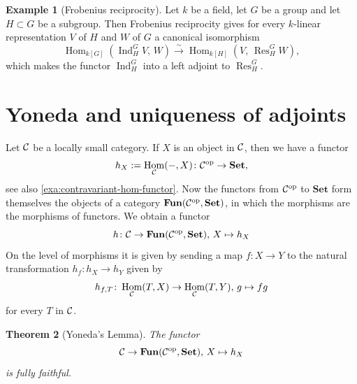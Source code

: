 \documentclass[11pt]{amsbook}
\newcommand{\isomto}{\overset{\sim}{\to}}
\DeclareMathOperator\Hom{Hom}
\DeclareMathOperator\Ind{Ind}
\DeclareMathOperator\Res{Res}
\def\opp{\mathrm{op}}
\def\Set{\mathbf{Set}}
\def\Fun{\mathbf{Fun}}
\theoremstyle{plain}
\newtheorem{theorem}{Theorem}
\theoremstyle{definition}
\newtheorem{example}[theorem]{Example}
\begin{document}
\begin{example}[Frobenius reciprocity]
Let $k$ be a field,  let $G$ be a group and let $H\subset G$ be a subgroup. Then Frobenius reciprocity gives for every $k$-linear representation $V$ of $H$ and $W$ of $G$ a canonical isomorphism
\[
	\Hom_{{k[G]}}( \Ind^G_H V,\, W ) \isomto \Hom_{{k[H]}}( V,\, \Res^G_H W ),
\]
which makes the functor $\Ind^G_H$ into a left adjoint to $\Res^G_H$.
\end{example}


\section{Yoneda and uniqueness of adjoints}
Let ${\mathcal{C}}$ be a locally small category.
If $X$ is an object in ${\mathcal{C}}$, then we have a functor 
\[
	h_X := \Hom_\cC(-,X)\colon \cC^\opp \to \Set,
\]
see also \ref{exa:contravariant-hom-functor}.
Now the  functors from $\cC^\opp$ to $\Set$ form themselves the objects of a category $\Fun(\cC^\opp,\Set)$, in which the morphisms are the morphisms of functors. We obtain a functor
\[
	h\colon \cC \to \Fun(\cC^\opp,\Set),\, X \mapsto h_X
\]
On the level of morphisms it is given by sending a map $f\colon X \to Y$ to the natural transformation $h_f\colon h_X \to h_Y$ given by
\[
	h_{f,T}\colon \Hom_\cC(T,X) \to \Hom_\cC(T,Y),\, g \mapsto fg
\]
for every $T$ in ${\mathcal{C}}$.

\begin{theorem}[Yoneda's Lemma]\label{thm:yoneda}
The functor
\[
	\cC \to \Fun(\cC^\opp,\Set),\, X \mapsto h_X
\]
is fully faithful. 
\end{theorem}
\end{document}
